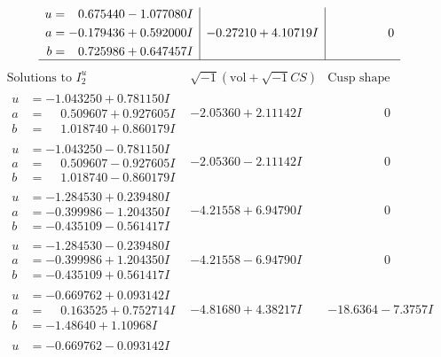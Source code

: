 \documentclass[1p]{elsarticle_modified}
\theoremstyle{definition}
\newcommand{\I}{\sqrt{-1}}
\begin{document}
$$\begin{array}{c|c|c}
\begin{aligned}
u &= \phantom{-}0.675440 - 1.077080 I \\
a &= -0.179436 + 0.592000 I \\
b &= \phantom{-}0.725986 + 0.647457 I\end{aligned}
 & -0.27210 + 4.10719 I & \phantom{-0.000000 } 0\\
 \hline 
 \end{array}$$\newpage$$\begin{array}{c|c|c}  
\text{Solutions to }I^u_{2}& \I (\text{vol} + \sqrt{-1}CS) & \text{Cusp shape}\\
 \hline 
\begin{aligned}
u &= -1.043250 + 0.781150 I \\
a &= \phantom{-}0.509607 + 0.927605 I \\
b &= \phantom{-}1.018740 + 0.860179 I\end{aligned}
 & -2.05360 + 2.11142 I & \phantom{-0.000000 } 0 \\ \hline\begin{aligned}
u &= -1.043250 - 0.781150 I \\
a &= \phantom{-}0.509607 - 0.927605 I \\
b &= \phantom{-}1.018740 - 0.860179 I\end{aligned}
 & -2.05360 - 2.11142 I & \phantom{-0.000000 } 0 \\ \hline\begin{aligned}
u &= -1.284530 + 0.239480 I \\
a &= -0.399986 - 1.204350 I \\
b &= -0.435109 - 0.561417 I\end{aligned}
 & -4.21558 + 6.94790 I & \phantom{-0.000000 } 0 \\ \hline\begin{aligned}
u &= -1.284530 - 0.239480 I \\
a &= -0.399986 + 1.204350 I \\
b &= -0.435109 + 0.561417 I\end{aligned}
 & -4.21558 - 6.94790 I & \phantom{-0.000000 } 0 \\ \hline\begin{aligned}
u &= -0.669762 + 0.093142 I \\
a &= \phantom{-}0.163525 + 0.752714 I \\
b &= -1.48640 + 1.10968 I\end{aligned}
 & -4.81680 + 4.38217 I & -18.6364 - 7.3757 I \\ \hline\begin{aligned}
u &= -0.669762 - 0.093142 I \\

\end{aligned}
\end{array}$$
\end{document}

